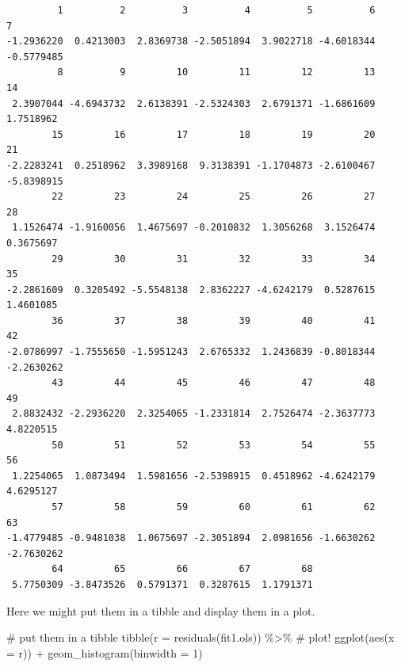 \documentclass[
  letterpaper,
  DIV=11,
  numbers=noendperiod]{scrartcl}
\newenvironment{Shaded}{\begin{snugshade}}{\end{snugshade}}
\newcommand{\AttributeTok}[1]{\textcolor[rgb]{0.40,0.45,0.13}{#1}}
\newcommand{\CommentTok}[1]{\textcolor[rgb]{0.37,0.37,0.37}{#1}}
\newcommand{\DecValTok}[1]{\textcolor[rgb]{0.68,0.00,0.00}{#1}}
\newcommand{\FunctionTok}[1]{\textcolor[rgb]{0.28,0.35,0.67}{#1}}
\newcommand{\NormalTok}[1]{\textcolor[rgb]{0.00,0.23,0.31}{#1}}
\newcommand{\SpecialCharTok}[1]{\textcolor[rgb]{0.37,0.37,0.37}{#1}}
\begin{document}
\begin{verbatim}
         1          2          3          4          5          6          7 
-1.2936220  0.4213003  2.8369738 -2.5051894  3.9022718 -4.6018344 -0.5779485 
         8          9         10         11         12         13         14 
 2.3907044 -4.6943732  2.6138391 -2.5324303  2.6791371 -1.6861609  1.7518962 
        15         16         17         18         19         20         21 
-2.2283241  0.2518962  3.3989168  9.3138391 -1.1704873 -2.6100467 -5.8398915 
        22         23         24         25         26         27         28 
 1.1526474 -1.9160056  1.4675697 -0.2010832  1.3056268  3.1526474  0.3675697 
        29         30         31         32         33         34         35 
-2.2861609  0.3205492 -5.5548138  2.8362227 -4.6242179  0.5287615  1.4601085 
        36         37         38         39         40         41         42 
-2.0786997 -1.7555650 -1.5951243  2.6765332  1.2436839 -0.8018344 -2.2630262 
        43         44         45         46         47         48         49 
 2.8832432 -2.2936220  2.3254065 -1.2331814  2.7526474 -2.3637773  4.8220515 
        50         51         52         53         54         55         56 
 1.2254065  1.0873494  1.5981656 -2.5398915  0.4518962 -4.6242179  4.6295127 
        57         58         59         60         61         62         63 
-1.4779485 -0.9481038  1.0675697 -2.3051894  2.0981656 -1.6630262 -2.7630262 
        64         65         66         67         68 
 5.7750309 -3.8473526  0.5791371  0.3287615  1.1791371 
\end{verbatim}

Here we might put them in a tibble and display them in a plot.

\begin{Shaded}
\begin{Highlighting}[]
\CommentTok{\# put them in a tibble}
\FunctionTok{tibble}\NormalTok{(}\AttributeTok{r =} \FunctionTok{residuals}\NormalTok{(fit1.ols)) }\SpecialCharTok{\%\textgreater{}\%} 
  \CommentTok{\# plot!}
  \FunctionTok{ggplot}\NormalTok{(}\FunctionTok{aes}\NormalTok{(}\AttributeTok{x =}\NormalTok{ r)) }\SpecialCharTok{+}
  \FunctionTok{geom\_histogram}\NormalTok{(}\AttributeTok{binwidth =} \DecValTok{1}\NormalTok{)}
\end{Highlighting}
\end{Shaded}
\end{document}
